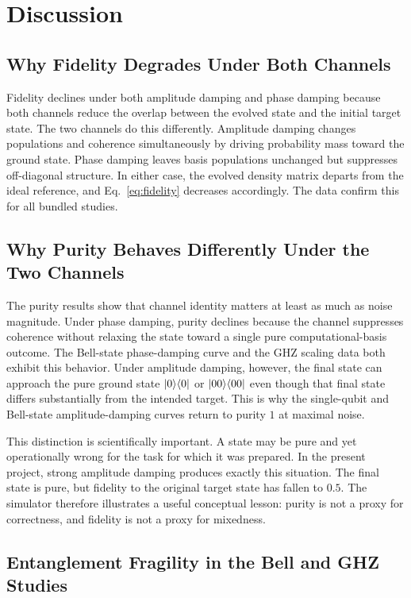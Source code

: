 \chapter{Discussion}

\section{Why Fidelity Degrades Under Both Channels}

Fidelity declines under both amplitude damping and phase damping because both channels reduce the overlap between the evolved state and the initial target state. The two channels do this differently. Amplitude damping changes populations and coherence simultaneously by driving probability mass toward the ground state. Phase damping leaves basis populations unchanged but suppresses off-diagonal structure. In either case, the evolved density matrix departs from the ideal reference, and Eq.~\eqref{eq:fidelity} decreases accordingly. The data confirm this for all bundled studies.

\section{Why Purity Behaves Differently Under the Two Channels}

The purity results show that channel identity matters at least as much as noise magnitude. Under phase damping, purity declines because the channel suppresses coherence without relaxing the state toward a single pure computational-basis outcome. The Bell-state phase-damping curve and the GHZ scaling data both exhibit this behavior. Under amplitude damping, however, the final state can approach the pure ground state $\lvert 0 \rangle\langle 0 \rvert$ or $\lvert 00 \rangle\langle 00 \rvert$ even though that final state differs substantially from the intended target. This is why the single-qubit and Bell-state amplitude-damping curves return to purity $1$ at maximal noise.

This distinction is scientifically important. A state may be pure and yet operationally wrong for the task for which it was prepared. In the present project, strong amplitude damping produces exactly this situation. The final state is pure, but fidelity to the original target state has fallen to $0.5$. The simulator therefore illustrates a useful conceptual lesson: purity is not a proxy for correctness, and fidelity is not a proxy for mixedness.

\section{Entanglement Fragility in the Bell and GHZ Studies}

